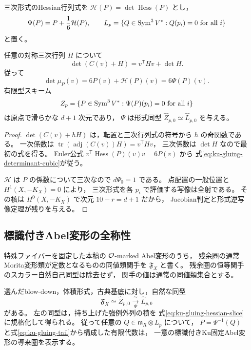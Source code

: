 三次形式のHessian行列式を $\mathcal H(P)=\det\operatorname{Hess}(P)$ とし，
\begin{equation}\label{eq:ku-gluing-psi}
 \Psi(P)=P+\frac16\mathcal H(P),\qquad
 L_p=\{Q\in\operatorname{Sym}^3V^*:Q(p_i)=0\ \text{for all }i\}
\end{equation}
と置く。

\begin{lemma}[行列式条件の線型化]
\label{lem:ku-gluing-determinant}
任意の対称三次行列 $H$ について
\[
 \det(C(v)+H)=v^{\mathsf T}Hv+\det H.
\]
従って
\begin{equation}\label{eq:ku-gluing-determinant-cubic}
 \det\mu_P(v)=6P(v)+\mathcal H(P)(v)=6\Psi(P)(v).
\end{equation}
有限型スキーム
\[
 Z_p=\{P\in\operatorname{Sym}^3V^*:\Psi(P)(p_i)=0\ \text{for all }i\}
\]
は原点で滑らかな $d+1$ 次元であり，
$\Psi$ は形式同型 $\widehat Z_{p,0}\simeq\widehat L_{p,0}$ を与える。
\end{lemma}

\begin{proof}
$\det(C(v)+hH)$ は，転置と三次行列式の符号から $h$ の奇関数である。
一次係数は $\operatorname{tr}(\operatorname{adj}(C(v))H)=v^{\mathsf T}Hv$，
三次係数は $\det H$ なので最初の式を得る。
Euler公式 $v^{\mathsf T}\operatorname{Hess}(P)(v)v=6P(v)$ から
式\eqref{eq:ku-gluing-determinant-cubic}が従う。

$\mathcal H$ は $P$ の係数について三次なので $d\Psi_0=1$ である。
点配置の一般位置と $H^1(X,-K_X)=0$ により，
三次形式を各 $p_i$ で評価する写像は全射である。
その核は $H^0(X,-K_X)$ で次元 $10-r=d+1$ だから，
Jacobian判定と形式逆写像定理が残りを与える。
\end{proof}

\subsection{標識付きAbel変形の全称性}

特殊ファイバーを固定した本稿の $\mathcal O$-marked Abel変形のうち，
残余圏の通常Morita変形類が定数となるものの同値類関手を
$\mathfrak F_X$ と書く。
残余圏の恒等関手のスカラー自然自己同型は除去せず，
関手の値は通常の同値類集合とする。

\begin{theorem}[Ku固定ファイバーの有限行列正規形]
\label{thm:ku-gluing-formal-universality}
選んだblow-down，体積形式，古典基底に対し，自然な同型
\[
 \mathfrak F_X
 \simeq \widehat Z_{p,0}
 \xrightarrow[\ \Psi\ ]{\ \sim\ }\widehat L_{p,0}
\]
がある。
左の同型は，持ち上げた強例外列の積を
式\eqref{eq:ku-gluing-hessian-slice}に規格化して得られる。
従って任意の $Q\in\mathfrak m_R\otimes L_p$ について，
$P=\Psi^{-1}(Q)$ と式\eqref{eq:ku-gluing-tail}から構成した有限代数は，
一意の標識付きKu固定Abel変形の導来圏を表示する。
\end{theorem}

